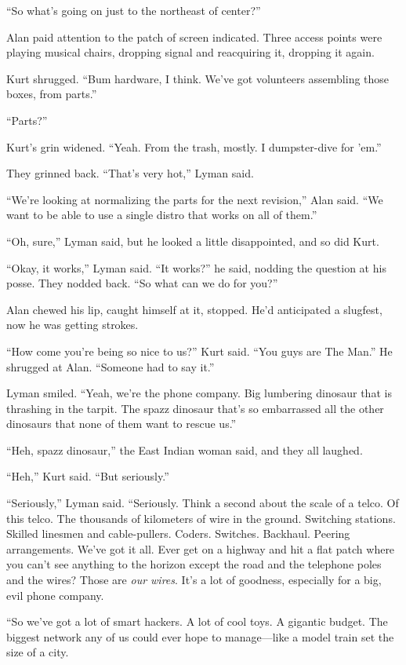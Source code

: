 \documentclass{article}
\begin{document}
``So what's going on just to the northeast of center?''

Alan paid attention to the patch of screen indicated.  Three access
points were playing musical chairs, dropping signal and reacquiring
it, dropping it again.

Kurt shrugged.  ``Bum hardware, I think.  We've got volunteers
assembling those boxes, from parts.''

``Parts?''

Kurt's grin widened.  ``Yeah.  From the trash, mostly.  I
dumpster-dive for 'em.''

They grinned back.  ``That's very hot,'' Lyman said.

``We're looking at normalizing the parts for the next revision,'' Alan
said.  ``We want to be able to use a single distro that works on all
of them.''

``Oh, sure,'' Lyman said, but he looked a little disappointed, and so
did Kurt.

``Okay, it works,'' Lyman said.  ``It works?'' he said, nodding the
question at his posse.  They nodded back.  ``So what can we do for
you?''

Alan chewed his lip, caught himself at it, stopped.  He'd anticipated
a slugfest, now he was getting strokes.

``How come you're being so nice to us?'' Kurt said.  ``You guys are
The Man.'' He shrugged at Alan.  ``Someone had to say it.''

Lyman smiled.  ``Yeah, we're the phone company.  Big lumbering
dinosaur that is thrashing in the tarpit.  The spazz dinosaur that's
so embarrassed all the other dinosaurs that none of them want to
rescue us.''

``Heh, spazz dinosaur,'' the East Indian woman said, and they all
laughed.

``Heh,'' Kurt said.  ``But seriously.''

``Seriously,'' Lyman said.  ``Seriously.  Think a second about the
scale of a telco.  Of this telco.  The thousands of kilometers of wire
in the ground.  Switching stations.  Skilled linesmen and
cable-pullers.  Coders.  Switches.  Backhaul.  Peering arrangements. 
We've got it all.  Ever get on a highway and hit a flat patch where
you can't see anything to the horizon except the road and the
telephone poles and the wires?  Those are \textit{our wires}.  It's a
lot of goodness, especially for a big, evil phone company.

``So we've got a lot of smart hackers.  A lot of cool toys.  A
gigantic budget.  The biggest network any of us could ever hope to
manage---like a model train set the size of a city.
\end{document}
